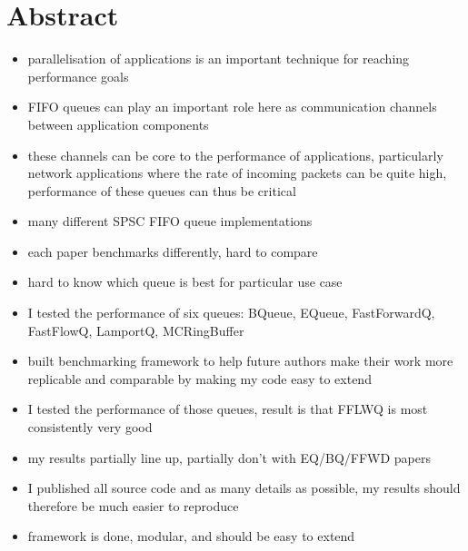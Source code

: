 \section*{Abstract}
\begin{itemize}
    \item parallelisation of applications is an important technique for reaching performance goals
    \item FIFO queues can play an important role here as communication channels between application components
    \item these channels can be core to the performance of applications, particularly network applications
        where the rate of incoming packets can be quite high, performance of these queues can thus be critical
    \item many different SPSC FIFO queue implementations
    \item each paper benchmarks differently, hard to compare
    \item hard to know which queue is best for particular use case
    \item I tested the performance of six queues: BQueue, EQueue, FastForwardQ, FastFlowQ, LamportQ, MCRingBuffer
    \item built benchmarking framework to help future authors make their work more replicable and comparable
        by making my code easy to extend
    \item I tested the performance of those queues, result is that FFLWQ is most consistently very good
    \item my results partially line up, partially don't with EQ/BQ/FFWD papers
    \item I published all source code and as many details as possible, my results should therefore be much easier to reproduce
    \item framework is done, modular, and should be easy to extend
\end{itemize}
